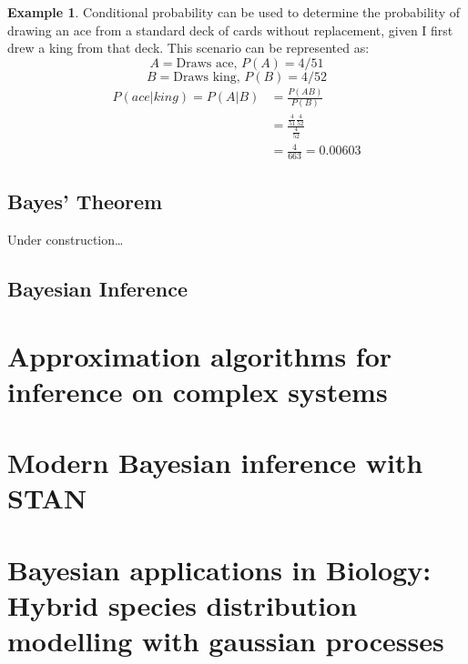 \documentclass[
  12pt,
]{book}
\theoremstyle{definition}
\theoremstyle{definition}
\newtheorem{example}{Example}[chapter]
\theoremstyle{definition}
\theoremstyle{remark}
\begin{document}
\begin{example}
\protect\hypertarget{exm:condprobe}{}{\label{exm:condprobe} }Conditional probability can be used to determine the probability of drawing an ace from a standard deck of cards without replacement, given I first drew a king from that deck. This scenario can be represented as:
\[A = \textrm{Draws ace, } P(A) = 4/51\]
\[B = \textrm{Draws king, } P(B) = 4/52\]
\[\begin{split}
P(ace|king) = P(A|B) & = \frac{P(AB)}{P(B)} \\
  & = \frac{\frac{4}{51}\frac{4}{52}}{\frac{4}{52}} \\
  & = \frac{4}{663} = 0.00603
\end{split}\]
\end{example}

\hypertarget{bayes-theorem}{%
\section{Bayes' Theorem}\label{bayes-theorem}}

Under construction\ldots{} \citep{Kotta2019}

\hypertarget{bayesian-inference}{%
\section{Bayesian Inference}\label{bayesian-inference}}

\hypertarget{approximation-algorithms-for-inference-on-complex-systems}{%
\chapter{Approximation algorithms for inference on complex systems}\label{approximation-algorithms-for-inference-on-complex-systems}}

\hypertarget{modern-bayesian-inference-with-stan}{%
\chapter{Modern Bayesian inference with STAN}\label{modern-bayesian-inference-with-stan}}

\hypertarget{bayesian-applications-in-biology-hybrid-species-distribution-modelling-with-gaussian-processes}{%
\chapter{Bayesian applications in Biology: Hybrid species distribution modelling with gaussian processes}\label{bayesian-applications-in-biology-hybrid-species-distribution-modelling-with-gaussian-processes}}

  
\end{document}
